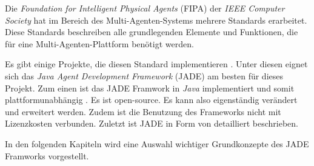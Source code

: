 Die \textit{Foundation for Intelligent Physical Agents} (FIPA) der \textit{IEEE Computer Society} hat im Bereich des Multi-Agenten-Systems mehrere Standards erarbeitet. Diese Standards beschreiben alle grundlegenden Elemente und Funktionen, die für eine Multi-Agenten-Plattform benötigt werden. \cite{article:flexibleSoftware}

Es gibt einige Projekte, die diesen Standard implementieren \cite{web:fipaList}. Unter diesen eignet sich das \textit{Java Agent Development Framework} (JADE) am besten für dieses Projekt. Zum einen ist das JADE Framwork in \textit{Java} implementiert und somit plattformunabhängig \cite{web:java}. Es ist open-source. Es kann also eigenständig verändert und erweitert werden. Zudem ist die Benutzung des Frameworks nicht mit Lizenzkosten verbunden. Zuletzt ist JADE in Form von \cite{book:jade} detailliert beschrieben.

In den folgenden Kapiteln wird eine Auswahl wichtiger Grundkonzepte des JADE Framworks vorgestellt. 